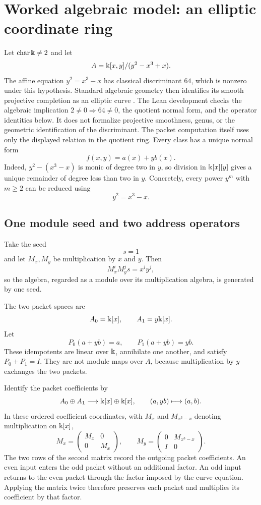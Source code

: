 \section{Worked algebraic model: an elliptic coordinate ring}

Let $\operatorname{char}\Bbbk\ne2$ and let
\[
A=\Bbbk[x,y]/(y^2-x^3+x).
\]
The affine equation $y^2=x^3-x$ has classical discriminant $64$, which is nonzero under this hypothesis. Standard algebraic geometry then identifies its smooth projective completion as an elliptic curve \cite{silverman2009}. The Lean development checks the algebraic implication $2\ne0\Rightarrow64\ne0$, the quotient normal form, and the operator identities below. It does not formalize projective smoothness, genus, or the geometric identification of the discriminant. The packet computation itself uses only the displayed relation in the quotient ring.
Every class has a unique normal form
\[
f(x,y)=a(x)+y b(x).
\]
Indeed, $y^2-(x^3-x)$ is monic of degree two in $y$, so division in $\Bbbk[x][y]$ gives a unique remainder of degree less than two in $y$. Concretely, every power $y^m$ with $m\ge2$ can be reduced using
\[
y^2=x^3-x.
\]

\subsection{One module seed and two address operators}

Take the seed
\[
s=1
\]
and let $M_x,M_y$ be multiplication by $x$ and $y$. Then
\[
M_x^iM_y^js=x^iy^j,
\]
so the algebra, regarded as a module over its multiplication algebra, is generated by one seed.

The two packet spaces are
\[
A_0=\Bbbk[x],
\qquad
A_1=y\Bbbk[x].
\]
Let
\[
P_0(a+yb)=a,
\qquad
P_1(a+yb)=yb.
\]
These idempotents are linear over $\Bbbk$, annihilate one another, and satisfy $P_0+P_1=I$. They are not module maps over $A$, because multiplication by $y$ exchanges the two packets.

Identify the packet coefficients by
\[
A_0\oplus A_1\longrightarrow\Bbbk[x]\oplus\Bbbk[x],
\qquad
(a,yb)\longmapsto(a,b).
\]
In these ordered coefficient coordinates, with $M_x$ and $M_{x^3-x}$ denoting multiplication on $\Bbbk[x]$,
\[
{
M_x=
\begin{pmatrix}
M_x&0\\
0&M_x
\end{pmatrix},
\qquad
M_y=
\begin{pmatrix}
0&M_{x^3-x}\\
I&0
\end{pmatrix}.
}
\]
The two rows of the second matrix record the outgoing packet coefficients. An even input enters the odd packet without an additional factor. An odd input returns to the even packet through the factor imposed by the curve equation. Applying the matrix twice therefore preserves each packet and multiplies its coefficient by that factor.

